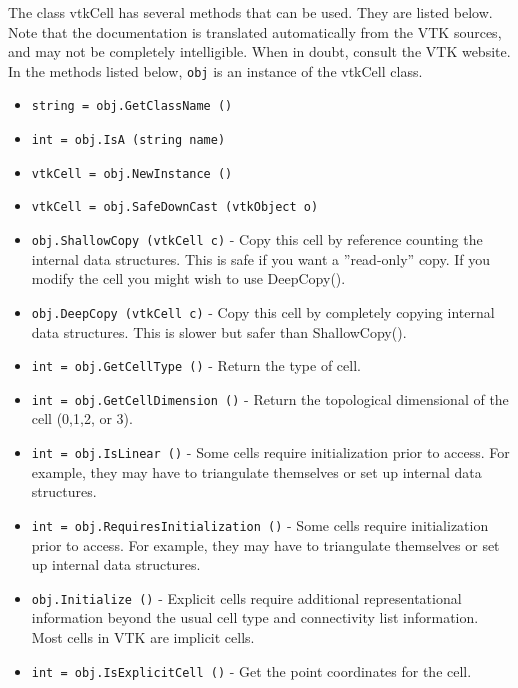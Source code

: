 The class vtkCell has several methods that can be used.
  They are listed below.
Note that the documentation is translated automatically from the VTK sources,
and may not be completely intelligible.  When in doubt, consult the VTK website.
In the methods listed below, \verb|obj| is an instance of the vtkCell class.
\begin{itemize}
\item  \verb|string = obj.GetClassName ()|

\item  \verb|int = obj.IsA (string name)|

\item  \verb|vtkCell = obj.NewInstance ()|

\item  \verb|vtkCell = obj.SafeDownCast (vtkObject o)|

\item  \verb|obj.ShallowCopy (vtkCell c)| -  Copy this cell by reference counting the internal data structures. 
 This is safe if you want a ''read-only'' copy. If you modify the cell
 you might wish to use DeepCopy().

\item  \verb|obj.DeepCopy (vtkCell c)| -  Copy this cell by completely copying internal data structures. This is
 slower but safer than ShallowCopy().

\item  \verb|int = obj.GetCellType ()| -  Return the type of cell.

\item  \verb|int = obj.GetCellDimension ()| -  Return the topological dimensional of the cell (0,1,2, or 3).

\item  \verb|int = obj.IsLinear ()| -  Some cells require initialization prior to access. For example, they
 may have to triangulate themselves or set up internal data structures.

\item  \verb|int = obj.RequiresInitialization ()| -  Some cells require initialization prior to access. For example, they
 may have to triangulate themselves or set up internal data structures.

\item  \verb|obj.Initialize ()| -  Explicit cells require additional representational information
 beyond the usual cell type and connectivity list information.
 Most cells in VTK are implicit cells.

\item  \verb|int = obj.IsExplicitCell ()| -  Get the point coordinates for the cell.


\end{itemize}
